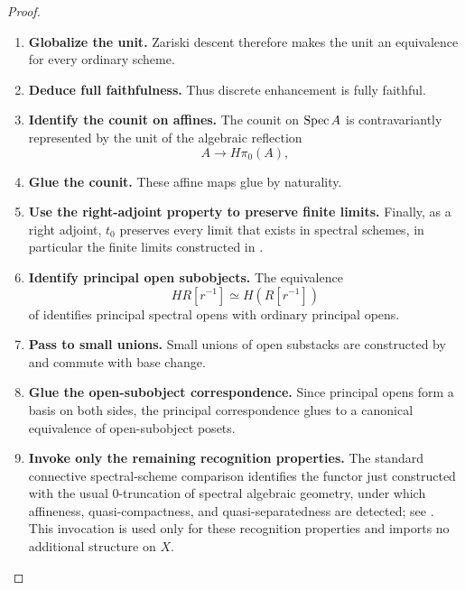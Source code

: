 \begin{proof}
\begin{enumerate}[label=\textup{(\arabic*)}]
    \item \textbf{Globalize the unit.}
    Zariski descent therefore makes the unit an equivalence for every ordinary
    scheme.

    \item \textbf{Deduce full faithfulness.}
    Thus discrete enhancement is fully faithful.

    \item \textbf{Identify the counit on affines.}
    The counit on
    \(\operatorname{Spec} A\) is contravariantly represented by the unit of the algebraic
    reflection
    \[
        A\longrightarrow H\pi_0(A),
    \]

    \item \textbf{Glue the counit.}
    These affine maps glue by naturality.

    \item \textbf{Use the right-adjoint property to preserve finite limits.}
    Finally, as a right adjoint,
    \(t_0\) preserves every limit that exists in spectral schemes, in
    particular the finite limits constructed in
    .

    \item \textbf{Identify principal open subobjects.}
    The equivalence
    \[
        HR[r^{-1}]\simeq H(R[r^{-1}])
    \]
    of  identifies principal
    spectral opens with ordinary principal opens.

    \item \textbf{Pass to small unions.}
    Small unions of open
    substacks are constructed by  and commute
    with base change.

    \item \textbf{Glue the open-subobject correspondence.}
    Since principal opens form a basis on both sides, the
    principal correspondence glues to a canonical equivalence of open-subobject
    posets.

    \item \textbf{Invoke only the remaining recognition properties.}
    The standard connective spectral-scheme comparison identifies the functor
    just constructed with the usual \(0\)-truncation of spectral algebraic
    geometry, under which affineness, quasi-compactness, and
    quasi-separatedness are detected; see \cite{LurieSAG}. This invocation is
    used only for these recognition properties and imports no additional
    structure on \(X\).
\end{enumerate}
\end{proof}


